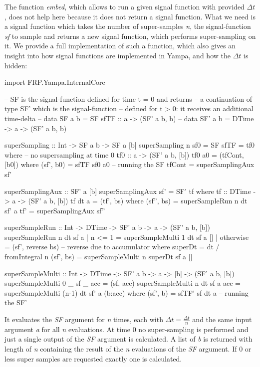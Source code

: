 The function \textit{embed}, which allows to run a given signal function with provided $\Delta t$, does not help here because it does not return a signal function. What we need is a signal function which takes the number of super-samples \textit{n}, the signal-function \textit{sf} to sample and returns a new signal function, which performs super-sampling on it. We provide a full implementation of such a function, which also gives an insight into how signal functions are implemented in Yampa, and how the $\Delta t$ is hidden:

\begin{HaskellCode}
import FRP.Yampa.InternalCore

-- SF is the signal-function defined for time t = 0 and returns
-- a continuation of type SF' which is the signal-function 
-- defined for t > 0: it receives an additional time-delta
-- data SF a b  = SF { sfTF :: a -> (SF' a b, b) }
-- data SF' a b = DTime -> a -> (SF' a b, b)

superSampling :: Int -> SF a b -> SF a [b]
superSampling n sf0 = SF { sfTF = tf0 }
  where
    -- no supersampling at time 0
    tf0 :: a -> (SF' a b, [b])
    tf0 a0 = (tfCont, [b0])
      where
        (sf', b0) = sfTF sf0 a0 -- running the SF
        tfCont    = superSamplingAux sf'

    superSamplingAux :: SF' a [b]
    superSamplingAux sf' = SF' tf
      where
        tf :: DTime -> a -> (SF' a b, [b])
        tf dt a = (tf', bs)
          where
            (sf'', bs) = superSampleRun n dt sf' a
            tf'        = superSamplingAux sf''

    superSampleRun :: Int -> DTime -> SF' a b -> a -> (SF' a b, [b])
    superSampleRun n dt sf a 
        | n <= 1    = superSampleMulti 1 dt sf a []
        | otherwise = (sf', reverse bs)  -- reverse due to accumulator
      where
        superDt   = dt / fromIntegral n
        (sf', bs) = superSampleMulti n superDt sf a []

    superSampleMulti :: Int -> DTime -> SF' a b -> a -> [b] -> (SF' a b, [b])
    superSampleMulti 0 _ sf _ acc  = (sf, acc)
    superSampleMulti n dt sf a acc = superSampleMulti (n-1) dt sf' a (b:acc) 
      where
        (sf', b) = sfTF' sf dt a -- running the SF'
\end{HaskellCode}

It evaluates the \textit{SF} argument for \textit{n} times, each with $\Delta t = \frac{\Delta t}{n}$ and the same input argument \textit{a} for all \textit{n} evaluations. At time 0 no super-sampling is performed and just a single output of the \textit{SF} argument is calculated. A list of \textit{b} is returned with length of \textit{n} containing the result of the \textit{n} evaluations of the \textit{SF} argument. If 0 or less super samples are requested exactly one is calculated. %

